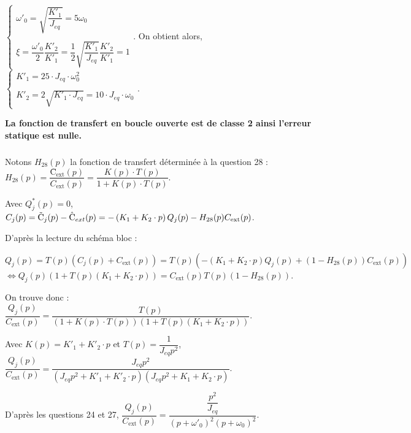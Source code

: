 \documentclass[10pt,fleqn]{article} %
\begin{document}
$
\left\{
\begin{array}{c}
\omega'_0=\sqrt{\dfrac{K'_1}{J_{eq}}}=5\omega_0\\
\\
\xi=\dfrac{\omega'_0}{2}\dfrac{K'_2}{K'_1}=\dfrac{1}{2}\sqrt{\dfrac{K'_1}{J_{eq}}}\dfrac{K'_2}{K'_1}=1
\end{array}
\right.
$. 
On obtient alors,
$
\left\{
\begin{array}{c}
K'_1=25\cdot J_{eq}\cdot \omega_0^2\\
\\
K'_2=2\sqrt{K'_1\cdot J_{eq}}=10\cdot J_{eq}\cdot \omega_0
\end{array}
\right.
$.

\textbf{La fonction de transfert en boucle ouverte est de classe 2 ainsi l'erreur statique est nulle. }

\subparagraph{}%

Notons $H_{28}(p)$ la fonction de transfert déterminée à la question 28 :  $
H_{28}(p)=\dfrac{\text{\^{C}}_{\text{ext}}(p)}{C_{\text{ext}}(p)}=\dfrac{K(p)\cdot T(p)}{1+K(p)\cdot T(p)}$.

Avec $Q^*_j(p)=0$, $
C_j(p)=\text{\~{C}}_j(p)-\text{\^{C}}_{ext}(p)=-\left(K_1+K_2\cdot p\right)Q_j(p)-H_{28}(p)C_{\text{ext}}(p)\\
$.

D'après la lecture du schéma bloc : 

$Q_j(p)=T(p)\left(C_j(p)+C_{\text{ext}}(p)\right)=T(p)\left(-\left(K_1+K_2\cdot p\right)Q_j(p)+\left(1-H_{28}(p)\right)C_{\text{ext}}(p)\right) $
$ \Leftrightarrow 
Q_j(p)\left(1+T(p)\left(K_1+K_2\cdot p\right)\right)=C_{\text{ext}}(p)T(p)\left(1-H_{28}(p)\right)$.

On trouve donc : $
\dfrac{Q_j(p)}{C_{\text{ext}}(p)}=\dfrac{T(p)}{\left(1+K(p)\cdot T(p)\right)\left(1+T(p)\left(K_1+K_2\cdot p\right)\right)}
$.

Avec $K(p)=K'_1+K'_2\cdot p$ et $T(p)=\dfrac{1}{J_{eq}p^2}$,
$
\dfrac{Q_j(p)}{C_{\text{ext}}(p)}=\dfrac{J_{eq}p^2}{\left(J_{eq}p^2+K'_1+K'_2\cdot p\right)\left(J_{eq}p^2+K_1+K_2\cdot p\right)}
$.

D'après les questions 24 et 27,
$
\dfrac{Q_j(p)}{C_{\text{ext}}(p)}=\dfrac{\dfrac{p^2}{J_{eq}}}{\left(p+\omega'_0\right)^2\left(p+\omega_0\right)^2}
$.
\end{document}
